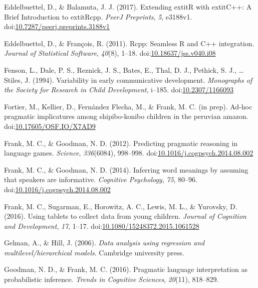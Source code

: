 \documentclass[man]{apa6}
\theoremstyle{definition}
\theoremstyle{definition}
\theoremstyle{definition}
\theoremstyle{remark}
\begin{document}
\hypertarget{ref-R-Rcpp_b}{}
Eddelbuettel, D., \& Balamuta, J. J. (2017). Extending extitR with
extitC++: A Brief Introduction to extitRcpp. \emph{PeerJ Preprints},
\emph{5}, e3188v1.
doi:\href{https://doi.org/10.7287/peerj.preprints.3188v1}{10.7287/peerj.preprints.3188v1}

\hypertarget{ref-R-Rcpp_a}{}
Eddelbuettel, D., \& François, R. (2011). Rcpp: Seamless R and C++
integration. \emph{Journal of Statistical Software}, \emph{40}(8),
1--18.
doi:\href{https://doi.org/10.18637/jss.v040.i08}{10.18637/jss.v040.i08}

\hypertarget{ref-fenson1994}{}
Fenson, L., Dale, P. S., Reznick, J. S., Bates, E., Thal, D. J.,
Pethick, S. J., \ldots{} Stiles, J. (1994). Variability in early
communicative development. \emph{Monographs of the Society for Research
in Child Development}, i--185.
doi:\href{https://doi.org/10.2307/1166093}{10.2307/1166093}

\hypertarget{ref-fortierunderrev}{}
Fortier, M., Kellier, D., Fernández Flecha, M., \& Frank, M. C. (in
prep). Ad-hoc pragmatic implicatures among shipibo-konibo children in
the peruvian amazon.
doi:\href{https://doi.org/10.17605/OSF.IO/X7AD9}{10.17605/OSF.IO/X7AD9}

\hypertarget{ref-frank2012}{}
Frank, M. C., \& Goodman, N. D. (2012). Predicting pragmatic reasoning
in language games. \emph{Science}, \emph{336}(6084), 998--998.
doi:\href{https://doi.org/10.1016/j.cogpsych.2014.08.002}{10.1016/j.cogpsych.2014.08.002}

\hypertarget{ref-frank2014}{}
Frank, M. C., \& Goodman, N. D. (2014). Inferring word meanings by
assuming that speakers are informative. \emph{Cognitive Psychology},
\emph{75}, 80--96.
doi:\href{https://doi.org/10.1016/j.cogpsych.2014.08.002}{10.1016/j.cogpsych.2014.08.002}

\hypertarget{ref-frank2016}{}
Frank, M. C., Sugarman, E., Horowitz, A. C., Lewis, M. L., \& Yurovsky,
D. (2016). Using tablets to collect data from young children.
\emph{Journal of Cognition and Development}, \emph{17}, 1--17.
doi:\href{https://doi.org/10.1080/15248372.2015.1061528}{10.1080/15248372.2015.1061528}

\hypertarget{ref-gelman2006data}{}
Gelman, A., \& Hill, J. (2006). \emph{Data analysis using regression and
multilevel/hierarchical models}. Cambridge university press.

\hypertarget{ref-goodman2016}{}
Goodman, N. D., \& Frank, M. C. (2016). Pragmatic language
interpretation as probabilistic inference. \emph{Trends in Cognitive
Sciences}, \emph{20}(11), 818--829.
\end{document}
